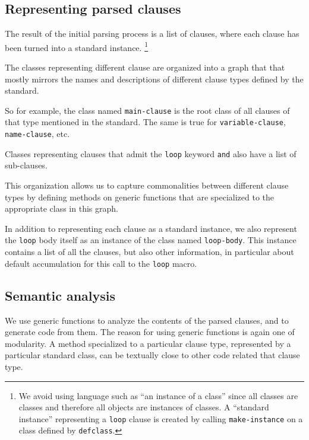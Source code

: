 \subsection{Representing parsed clauses}
\label{sec-our-technique-representing-parsed-clauses}

The result of the initial parsing process is a list of clauses, where
each clause has been turned into a standard instance.%
\footnote{We avoid using language such as ``an instance of a \clos{}
  class'' since all classes are \clos{} classes and therefore all
  \commonlisp{} objects are instances of \clos{} classes.  A
  ``standard instance'' representing a \texttt{loop} clause is created
  by calling \texttt{make-instance} on a class defined by
  \texttt{defclass}.}

The classes representing different clause are organized into a graph
that that mostly mirrors the names and descriptions of different
clause types defined by the \commonlisp{} standard.

So for example, the class named \texttt{main-clause} is
the root class of all clauses of that type mentioned in the standard.
The same is true for \texttt{variable-clause}, \texttt{name-clause},
etc.

Classes representing clauses that admit the \texttt{loop} keyword
\texttt{and} also have a list of sub-clauses.

This organization allows us to capture commonalities between different
clause types by defining methods on generic functions that are
specialized to the appropriate class in this graph.

In addition to representing each clause as a standard instance, we
also represent the \texttt{loop} body itself as an instance of the
class named \texttt{loop-body}.  This instance contains a list of all
the clauses, but also other information, in particular about default
accumulation for this call to the \texttt{loop} macro.

\subsection{Semantic analysis}
\label{sec-our-technique-semantic-analysis}

We use generic functions to analyze the contents of the parsed
clauses, and to generate code from them.  The reason for using generic
functions is again one of modularity.  A method specialized to a
particular clause type, represented by a particular standard class,
can be textually close to other code related that clause type.


